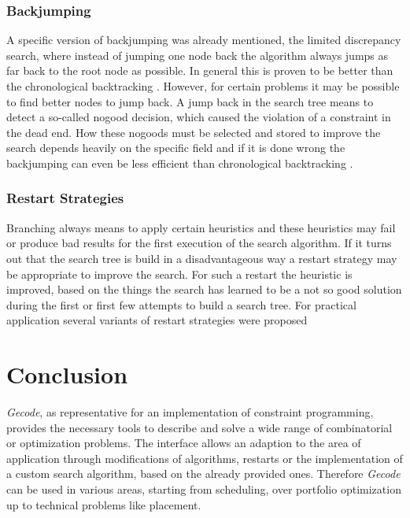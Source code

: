 \documentclass[10pt,
               a4paper,
               journal,
               ]{IEEEtran}
\begin{document}
	\subsubsection{Backjumping}
	A specific version of backjumping was already mentioned, the limited discrepancy search, where instead of jumping one node back the algorithm always jumps as far back to the root node as possible. In general this is proven to be better than the chronological backtracking \cite{limitedDiscrepancy}. However, for certain problems it may be possible to find better nodes to jump back. A jump back in the search tree means to detect a so-called nogood decision, which caused the violation of a constraint in the dead end. How these nogoods must be selected and stored to improve the search depends heavily on the specific field and if it is done wrong the backjumping can even be less efficient than chronological backtracking \cite[p.~100]{handbookCP}.
	
	\subsubsection{Restart Strategies}
	Branching always means to apply certain heuristics and these heuristics may fail or produce bad results for the first execution of the search algorithm. If it turns out that the search tree is build in a disadvantageous way a restart strategy may be appropriate to improve the search. For such a restart the heuristic is improved, based on the things the search has learned to be a not so good solution during the first or first few attempts to build a search tree.
	For practical application several variants of restart strategies were proposed \cite[p.~113]{handbookCP}
	
	\section{Conclusion}
	\emph{Gecode}, as representative for an implementation of constraint programming, provides the necessary tools to describe and solve a wide range of combinatorial or optimization problems. The interface allows an adaption to the area of application through modifications of algorithms, restarts or the implementation of a custom search algorithm, based on the already provided ones. Therefore \emph{Gecode} can be used in various areas, starting from scheduling, over portfolio optimization up to technical problems like placement.
	
\end{document}
